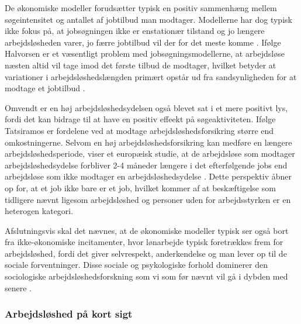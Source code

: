 De økonomiske modeller forudsætter typisk en positiv sammenhæng mellem søgeintensitet og antallet af jobtilbud man modtager. Modellerne har dog typisk ikke fokus på, at jobsøgningen ikke er enstationær tilstand og jo længere arbejdsløsheden varer, jo færre jobtilbud vil der for det meste komme \parencite[119]{Cahuc2004}. Ifølge Halvorsen er et væsentligt problem med jobsøgningsmodellerne, at arbejdsløse næsten altid vil tage imod det første tilbud de modtager, hvilket betyder at variationer i arbejdsløshedslængden primært opstår ud fra sandsynligheden for at modtage et jobtilbud \parencite[28]{Halvorsen1999}.

Omvendt er en høj arbejdsløshedsydelsen også blevet sat i et mere positivt lys, fordi det kan bidrage til at have en positiv effeekt på søgeaktiviteten. Ifølge Tatsiramos er fordelene ved at modtage arbejdsløshedsforsikring større end omkostningerne. Selvom en høj arbejdsløshedsforsikring kan medføre en længere arbejdsløshedsperiode, viser et europæisk studie, at de arbejdsløse som modtager arbejdsløshedsydelse forbliver 2-4 måneder længere i det efterfølgende jobs end arbejdsløse som ikke modtager en arbejdsløshedsydelse \parencite[602]{Mankiw2011}. Dette perspektiv åbner op for, at et job ikke bare er et job, hvilket kommer af at beskæftigelse som tidligere nævnt ligesom arbejdsløshed og personer uden for arbejdsstyrken er en heterogen kategori. %

 Afslutningsvis skal det nævnes, at de økonomiske modeller typisk ser også bort fra ikke-økonomiske incitamenter, hvor lønarbejde typisk foretrækkes frem for arbejdsløshed, fordi det giver selvrespekt, anderkendelse og man lever op til de sociale forventninger. Disse sociale og psykologiske forhold dominerer den sociologiske arbejdsløshedsforskning som vi som før nævnt vil gå i dybden med senere \parencite{Jahoda1971, Eisenberg1938, Ezzy1993, Halvorsen1999, Baum2001, Noerup2014}. %


\subsubsection{Arbejdsløshed på kort sigt} %

